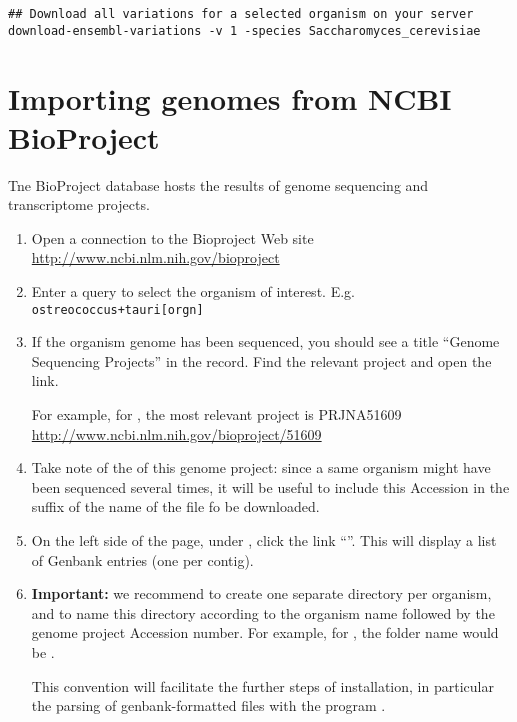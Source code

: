 \begin{lstlisting}
## Download all variations for a selected organism on your server
download-ensembl-variations -v 1 -species Saccharomyces_cerevisiae
\end{lstlisting}

\section{Importing genomes from NCBI BioProject}

Tne BioProject database hosts the results of genome sequencing and
transcriptome projects. 

\begin{enumerate}
\item Open a connection to the Bioproject Web site \\
  \url{http://www.ncbi.nlm.nih.gov/bioproject}

\item Enter a query to select the organism of interest.
  E.g. \texttt{ostreococcus+tauri[orgn]}

\item If the organism genome has been sequenced, you should see a
  title ``Genome Sequencing Projects'' in the record. Find the
  relevant project and open the link.

  For example, for
  , the most relevant project is PRJNA51609 \\
  \url{http://www.ncbi.nlm.nih.gov/bioproject/51609}

\item Take note of the  of this genome project:
  since a same organism might have been sequenced several times, it
  will be useful to include this Accession in the suffix of the name
  of the file fo be downloaded.

\item On the left side of the page, under , click the link ``''. This will display a list of Genbank entries (one per contig).

\item \textbf{Important:} we recommend to create one separate
  directory per organism, and to name this directory according to the
  organism name followed by the genome project Accession number. For
  example, for , the folder name would be
  .

  This convention will facilitate the further steps of installation,
  in particular the parsing of genbank-formatted files with the
  program .


\end{enumerate}

